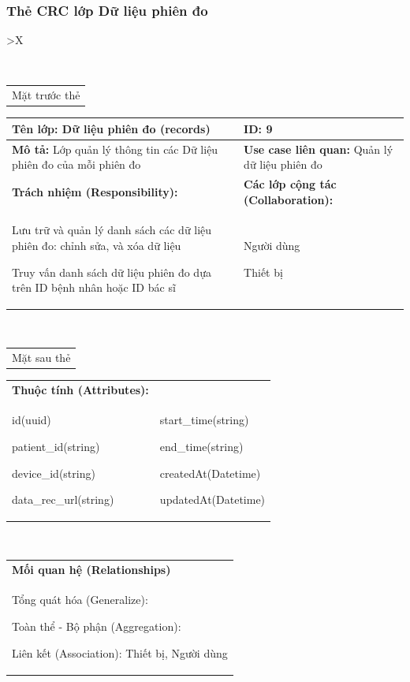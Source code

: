 \subsubsection{Thẻ CRC lớp Dữ liệu phiên đo}

\begin{xltabular}{\textwidth}{
		>{\centering\arraybackslash}X
	}
	\caption{\bfseries \fontsize{12pt}{0pt}\selectfont Thẻ CRC lớp Dữ liệu phiên đo}
	\\
	\begin{tabularx}{0.9\textwidth}{X}
		Mặt trước thẻ
	\end{tabularx}
	\begin{tabularx}{0.9\textwidth}{|X|X|}
		\hline
		\textbf{Tên lớp:} Dữ liệu phiên đo (records)                                & \textbf{ID:} 9                                         \\
		\hline
		\textbf{Mô tả:} Lớp quản lý thông tin các Dữ liệu phiên đo của mỗi phiên đo & \textbf{Use case liên quan:}  Quản lý dữ liệu phiên đo \\
		\hline
		\textbf{Trách nhiệm (Responsibility):}                                      & \textbf{Các lớp cộng tác (Collaboration):}             \\
		Lưu trữ và quản lý danh sách các dữ liệu phiên đo: chỉnh sửa, và xóa dữ liệu

		Truy vấn danh sách dữ liệu phiên đo dựa trên ID bệnh nhân hoặc ID bác sĩ
		                                                                            &
		Người dùng

		Thiết bị
		\\
		\hline
	\end{tabularx}
	\\
	\begin{tabularx}{0.9\textwidth}{X}
		Mặt sau thẻ
	\end{tabularx}
	\begin{tabularx}{0.9\textwidth}{|X|X|}
		\hline
		\textbf{Thuộc tính (Attributes):} & \\
		id(uuid)

		patient\_id(string)

		device\_id(string)

		data\_rec\_url(string)
		                                  &
		start\_time(string)

		end\_time(string)

		createdAt(Datetime)

		updatedAt(Datetime)
		\\ \hline
	\end{tabularx}
	\\
	\begin{tabularx}{0.9\textwidth}{|X|}
		\hline
		\textbf{Mối quan hệ (Relationships)} \\
		Tổng quát hóa (Generalize):

		Toàn thể - Bộ phận (Aggregation):

		Liên kết (Association): Thiết bị, Người dùng
		\\
		\hline
	\end{tabularx}
\end{xltabular}

